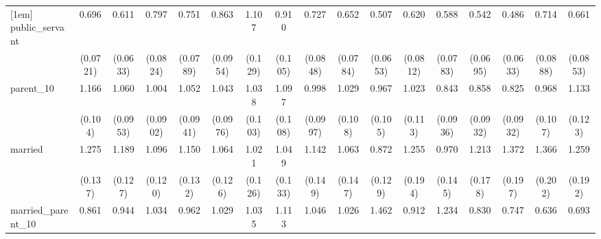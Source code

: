 {\begin{tabular}{l*{16}{c}}
[1em]
public\_servant      &       0.696\sym{***}&       0.611\sym{***}&       0.797\sym{*}  &       0.751\sym{**} &       0.863         &       1.107         &       0.910         &       0.727\sym{**} &       0.652\sym{***}&       0.507\sym{***}&       0.620\sym{***}&       0.588\sym{***}&       0.542\sym{***}&       0.486\sym{***}&       0.714\sym{**} &       0.661\sym{**} \\
                    &    (0.0721)         &    (0.0633)         &    (0.0824)         &    (0.0789)         &    (0.0954)         &     (0.129)         &     (0.105)         &    (0.0848)         &    (0.0784)         &    (0.0653)         &    (0.0812)         &    (0.0783)         &    (0.0695)         &    (0.0633)         &    (0.0888)         &    (0.0853)         \\
[1em]
parent\_10           &       1.166         &       1.060         &       1.004         &       1.052         &       1.043         &       1.038         &       1.097         &       0.998         &       1.029         &       0.967         &       1.023         &       0.843         &       0.858         &       0.825         &       0.968         &       1.133         \\
                    &     (0.104)         &    (0.0953)         &    (0.0902)         &    (0.0941)         &    (0.0976)         &     (0.103)         &     (0.108)         &    (0.0997)         &     (0.108)         &     (0.105)         &     (0.113)         &    (0.0936)         &    (0.0932)         &    (0.0932)         &     (0.107)         &     (0.123)         \\
[1em]
married             &       1.275\sym{*}  &       1.189         &       1.096         &       1.150         &       1.064         &       1.021         &       1.049         &       1.142         &       1.063         &       0.872         &       1.255         &       0.970         &       1.213         &       1.372\sym{*}  &       1.366\sym{*}  &       1.259         \\
                    &     (0.137)         &     (0.127)         &     (0.120)         &     (0.132)         &     (0.126)         &     (0.126)         &     (0.133)         &     (0.149)         &     (0.147)         &     (0.129)         &     (0.194)         &     (0.145)         &     (0.178)         &     (0.197)         &     (0.202)         &     (0.192)         \\
[1em]
married\_parent\_10   &       0.861         &       0.944         &       1.034         &       0.962         &       1.029         &       1.035         &       1.113         &       1.046         &       1.026         &       1.462\sym{*}  &       0.912         &       1.234         &       0.830         &       0.747         &       0.636\sym{*}  &       0.693         \\

\end{tabular}}
